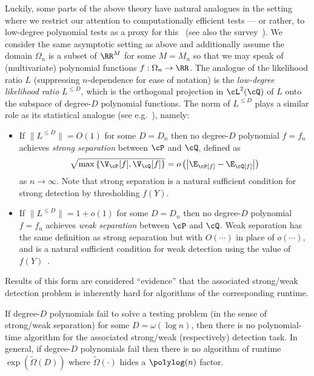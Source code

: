 \documentclass[11pt]{article}
\begin{document}
Luckily, some parts of the above theory have natural analogues in the setting where we restrict our attention to computationally efficient tests --- or rather, to low-degree polynomial tests as a proxy for this~\cite{HS-bayesian,sos-detect,hopkins-thesis} (see also the survey~\cite{ld-notes}). We consider the same asymptotic setting as above and additionally assume the domain $\Omega_n$ is a subset of $\RR^M$ for some $M = M_n$ so that we may speak of (multivariate) polynomial functions $f: \Omega_n \to \RR$. The analogue of the likelihood ratio $L$ (suppressing $n$-dependence for ease of notation) is the \emph{low-degree likelihood ratio} $L^{\le D}$, which is the orthogonal projection in $\cL^2(\cQ)$ of $L$ onto the subspace of degree-$D$ polynomial functions. The norm of $L^{\le D}$ plays a similar role as its statistical analogue (see e.g.~\cite[Proposition~6.2]{fp}), namely:
\begin{itemize}
    \item If $\|L^{\le D}\| = O(1)$ for some $D = D_n$ then no degree-$D$ polynomial $f = f_n$ achieves \emph{strong separation} between $\cP$ and $\cQ$, defined as
    \[ \sqrt{\max\left\{\V_{\cP}[f],\V_{\cQ}[f]\right\}} = o\left(\left|\E_\cP[f] - \E_\cQ[f]\right|\right) \]
    as $n \to \infty$. Note that strong separation is a natural sufficient condition for strong detection by thresholding $f(Y)$.
    \item If $\|L^{\le D}\| = 1+o(1)$ for some $D = D_n$ then no degree-$D$ polynomial $f = f_n$ achieves \emph{weak separation} between $\cP$ and $\cQ$. Weak separation has the same definition as strong separation but with $O(\cdots)$ in place of $o(\cdots)$, and is a natural sufficient condition for weak detection using the value of $f(Y)$~\cite[Proposition~6.1]{fp}.
\end{itemize}

\noindent Results of this form are considered ``evidence'' that the associated strong/weak detection problem is inherently hard for algorithms of the corresponding runtime.

\begin{conjecture}
\label{conj:ld}
If degree-$D$ polynomials fail to solve a testing problem (in the sense of strong/weak separation) for some $D = \omega(\log n)$, then there is no polynomial-time algorithm for the associated strong/weak (respectively) detection task. In general, if degree-$D$ polynomials fail then there is no algorithm of runtime $\exp(\tilde\Omega(D))$ where $\tilde\Omega(\cdot)$ hides a $\polylog(n)$ factor.
\end{conjecture}
\end{document}
